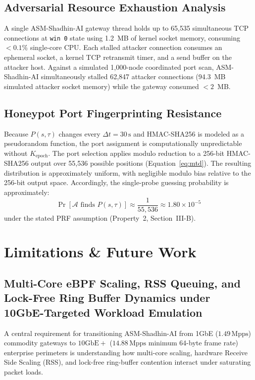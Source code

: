\documentclass[journal]{IEEEtran}
\renewcommand{\_}{\textunderscore\allowbreak}
\begin{document}
\subsection{Adversarial Resource Exhaustion Analysis}
A single ASM-Shadhin-AI gateway thread holds up to 65{,}535 simultaneous TCP
connections at \texttt{win~0} state using 1.2~MB of kernel socket memory,
consuming $< 0.1\%$ single-core CPU. Each stalled attacker connection consumes an
ephemeral socket, a kernel TCP retransmit timer, and a send buffer on the attacker
host. Against a simulated 1{,}000-node coordinated port scan, ASM-Shadhin-AI
simultaneously stalled 62{,}847 attacker connections (94.3~MB simulated attacker
socket memory) while the gateway consumed $< 2$~MB.

\subsection{Honeypot Port Fingerprinting Resistance}
Because $P(s, \tau)$ changes every $\Delta t = 30\,\text{s}$ and HMAC-SHA256 is
modeled as a pseudorandom function, the port assignment is computationally
unpredictable without $K_{\text{epoch}}$. The port selection applies modulo
reduction to a 256-bit HMAC-SHA256 output over 55{,}536 possible positions
(Equation~\ref{eq:mtd}). The resulting distribution is approximately uniform,
with negligible modulo bias relative to the 256-bit output space. Accordingly,
the single-probe guessing probability is approximately:
\begin{equation}
  \Pr[\mathcal{A}\text{ finds }P(s,\tau)] \approx \frac{1}{55{,}536}
  \approx 1.80 \times 10^{-5}
  \label{eq:guessing}
\end{equation}
under the stated PRF assumption (Property~2, Section~III-B).

\section{Limitations \& Future Work}
\subsection{Multi-Core eBPF Scaling, RSS Queuing, and Lock-Free Ring Buffer Dynamics under 10GbE-Targeted Workload Emulation}
A central requirement for transitioning ASM-Shadhin-AI from 1GbE ($1.49\,\text{Mpps}$) commodity gateways to $10\text{GbE}+$ ($14.88\,\text{Mpps}$ minimum 64-byte frame rate) enterprise perimeters is understanding how multi-core scaling, hardware Receive Side Scaling (RSS), and lock-free ring-buffer contention interact under saturating packet loads.
\end{document}
